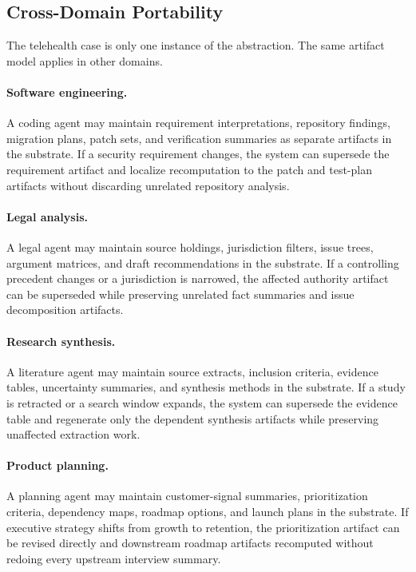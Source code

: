 \documentclass{article}
\begin{document}
\subsection{Cross-Domain Portability}

The telehealth case is only one instance of the abstraction. The same artifact model applies in other domains.

\paragraph{Software engineering.} A coding agent may maintain requirement interpretations, repository findings, migration plans, patch sets, and verification summaries as separate artifacts in the substrate. If a security requirement changes, the system can supersede the requirement artifact and localize recomputation to the patch and test-plan artifacts without discarding unrelated repository analysis.

\paragraph{Legal analysis.} A legal agent may maintain source holdings, jurisdiction filters, issue trees, argument matrices, and draft recommendations in the substrate. If a controlling precedent changes or a jurisdiction is narrowed, the affected authority artifact can be superseded while preserving unrelated fact summaries and issue decomposition artifacts.

\paragraph{Research synthesis.} A literature agent may maintain source extracts, inclusion criteria, evidence tables, uncertainty summaries, and synthesis methods in the substrate. If a study is retracted or a search window expands, the system can supersede the evidence table and regenerate only the dependent synthesis artifacts while preserving unaffected extraction work.

\paragraph{Product planning.} A planning agent may maintain customer-signal summaries, prioritization criteria, dependency maps, roadmap options, and launch plans in the substrate. If executive strategy shifts from growth to retention, the prioritization artifact can be revised directly and downstream roadmap artifacts recomputed without redoing every upstream interview summary.
\end{document}

